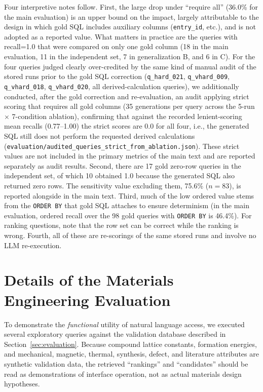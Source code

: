Four interpretive notes follow. First, the large drop under ``require all'' (36.0\% for the main evaluation) is an upper bound on the impact, largely attributable to the design in which gold SQL includes auxiliary columns (\texttt{entry\_id}, etc.), and is not adopted as a reported value. What matters in practice are the queries with recall=1.0 that were compared on only one gold column (18 in the main evaluation, 11 in the independent set, 7 in generalization B, and 6 in C). For the four queries judged clearly over-credited by the same kind of manual audit of the stored runs prior to the gold SQL correction (\texttt{q\_hard\_021}, \texttt{q\_vhard\_009}, \texttt{q\_vhard\_018}, \texttt{q\_vhard\_020}, all derived-calculation queries), we additionally conducted, after the gold correction and re-evaluation, an audit applying strict scoring that requires all gold columns (35 generations per query across the 5-run $\times$ 7-condition ablation), confirming that against the recorded lenient-scoring mean recalls (0.77--1.00) the strict scores are 0.0 for all four, i.e., the generated SQL still does not perform the requested derived calculations (\texttt{evaluation/audited\_queries\_strict\_from\_ablation.json}). These strict values are not included in the primary metrics of the main text and are reported separately as audit results. Second, there are 17 gold zero-row queries in the independent set, of which 10 obtained 1.0 because the generated SQL also returned zero rows. The sensitivity value excluding them, 75.6\% ($n=83$), is reported alongside in the main text. Third, much of the low ordered value stems from the \texttt{ORDER BY} that gold SQL attaches to ensure determinism (in the main evaluation, ordered recall over the 98 gold queries with \texttt{ORDER BY} is 46.4\%). For ranking questions, note that the row set can be correct while the ranking is wrong. Fourth, all of these are re-scorings of the same stored runs and involve no LLM re-execution.

\section{Details of the Materials Engineering Evaluation}
\label{sec:sup_materials_eval}

To demonstrate the \emph{functional} utility of natural language access, we executed several exploratory queries against the validation database described in Section~\ref{sec:evaluation}. Because compound lattice constants, formation energies, and mechanical, magnetic, thermal, synthesis, defect, and literature attributes are synthetic validation data, the retrieved ``rankings'' and ``candidates'' should be read as demonstrations of interface operation, not as actual materials design hypotheses.

